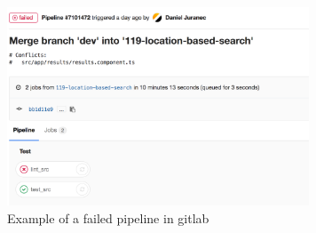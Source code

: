 \begin{figure}[H]
\begin{center}
\includegraphics[width=9cm]{figures/cicd_failed_pipeline}
\end{center}
\caption{Example of a failed pipeline in gitlab}
\label{fig:cicd_failed_pipeline}
\end{figure}
